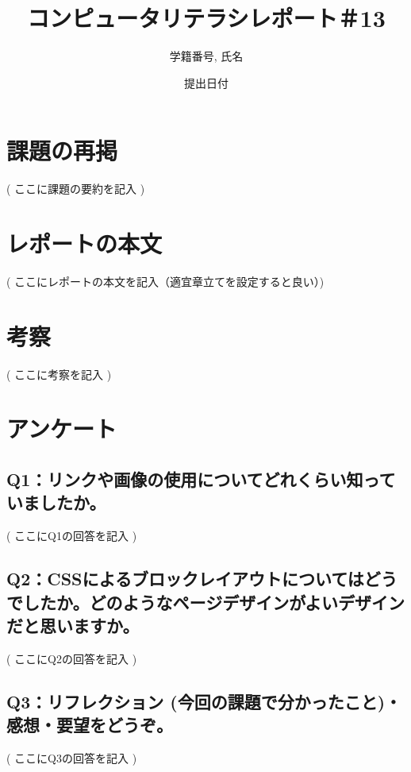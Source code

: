 \documentclass[12pt,a4j]{jarticle}
\begin{document}
\title{コンピュータリテラシレポート＃13}
\author{学籍番号, 氏名}
\date{提出日付}
\maketitle


\section{課題の再掲}
( ここに課題の要約を記入 )

\section{レポートの本文}
( ここにレポートの本文を記入（適宜章立てを設定すると良い）)

\section{考察}
( ここに考察を記入 )

\section{アンケート}

\subsection{Q1：リンクや画像の使用についてどれくらい知っていましたか。}
( ここにQ1の回答を記入 )

\subsection{Q2：CSSによるブロックレイアウトについてはどうでしたか。どのようなページデザインがよいデザインだと思いますか。}
( ここにQ2の回答を記入 )

\subsection{Q3：リフレクション (今回の課題で分かったこと)・感想・要望をどうぞ。}
( ここにQ3の回答を記入 )
\end{document}
